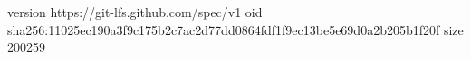 version https://git-lfs.github.com/spec/v1
oid sha256:11025ec190a3f9c175b2c7ac2d77dd0864fdf1f9ec13be5e69d0a2b205b1f20f
size 200259
